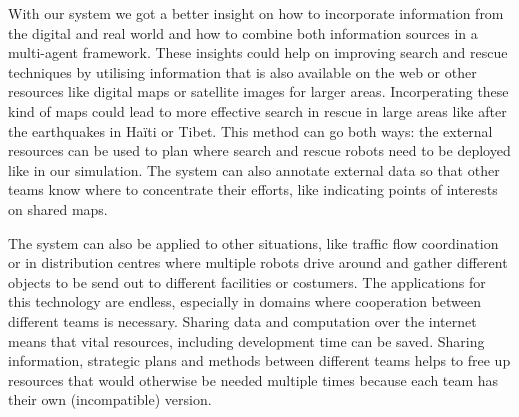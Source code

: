 With our system we got a better insight on how to incorporate information from
the digital and real world and how to combine both information sources in a
multi-agent framework. These insights could help on improving search and rescue
techniques by utilising information that is also available on the web or other
resources like digital maps or satellite images for larger areas. Incorperating
these kind of maps could lead to more effective search in rescue in large areas
like after the earthquakes in Ha\"iti or Tibet. This method can go both ways:
the external resources can be used to plan where search and rescue robots need
to be deployed like in our simulation. The system can also annotate external
data so that other teams know where to concentrate their efforts, like
indicating points of interests on shared maps.

The system can also be applied to other situations, like traffic flow
coordination or in distribution centres where multiple robots drive around and
gather different objects to be send out to different facilities or costumers.
The applications for this technology are endless, especially in domains where
cooperation between different teams is necessary. Sharing data and computation
over the internet means that vital resources, including development time can be
saved. Sharing information, strategic plans and methods between different teams
helps to free up resources that would otherwise be needed multiple times
because each team has their own (incompatible) version.
